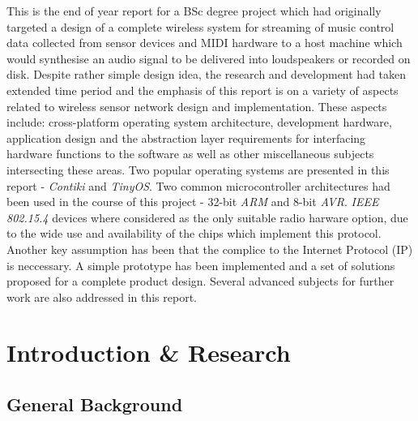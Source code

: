\date{\today}




\maketitle


\abstract
{

   This is the end of year report for a BSc degree project which had originally
   targeted a design of a complete wireless system for streaming of music control
   data collected from sensor devices and MIDI hardware to a host machine which
   would synthesise an audio signal to be delivered into loudspeakers or recorded
   on disk. Despite rather simple design idea, the research and development had
   taken extended time period and the emphasis of this report is on a variety of
   aspects related to wireless sensor network design and implementation. These
   aspects include: cross-platform operating system architecture, development
   hardware, application design and the abstraction layer requirements for
   interfacing hardware functions to the software as well as other miscellaneous
   subjects intersecting these areas. Two popular operating systems are presented
   in this report - \emph{Contiki} and \emph{TinyOS}. Two common microcontroller
   architectures had been used in the course of this project - 32-bit \emph{ARM}
   and 8-bit \emph{AVR}. \emph{IEEE 802.15.4} devices where considered as the
   only suitable radio harware option, due to the wide use and availability of
   the chips which implement this protocol. Another key assumption has been that
   the complice to the Internet Protocol (IP) is neccessary. A simple prototype
   has been implemented and a set of solutions proposed for a complete product
   design. Several advanced subjects for further work are also addressed in this
   report.

}

\tableofcontents
\listoffigures


\part{Introduction \& Research}
\chapter{General Background}

